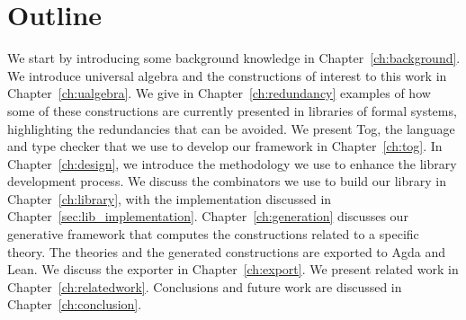 \section{Outline}
We start by introducing some background knowledge in Chapter~\ref{ch:background}. 
We introduce universal algebra and the constructions of interest to this work in Chapter~\ref{ch:ualgebra}. 
We give in Chapter~\ref{ch:redundancy} examples of how some of these constructions are currently presented in libraries of formal systems, highlighting the redundancies that can be avoided.
We present Tog, the language and type checker that we use to develop our framework in Chapter~\ref{ch:tog}. 
In Chapter~\ref{ch:design}, we introduce the methodology we use to enhance the library development process. 
We discuss the combinators we use to build our library in Chapter~\ref{ch:library}, with the implementation discussed in Chapter~\ref{sec:lib_implementation}. 
Chapter~\ref{ch:generation} discusses our generative framework that computes the constructions related to a specific theory.  
The theories and the generated constructions are exported to Agda and Lean. We discuss the exporter in Chapter~\ref{ch:export}. 
We present related work in Chapter~\ref{ch:relatedwork}. Conclusions and future work are discussed in Chapter~\ref{ch:conclusion}. 

